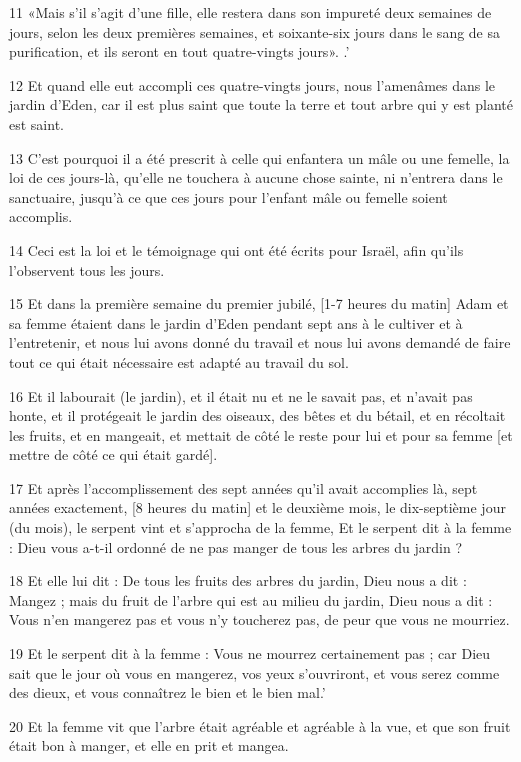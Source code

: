 \par 11 «Mais s'il s'agit d'une fille, elle restera dans son impureté deux semaines de jours, selon les deux premières semaines, et soixante-six jours dans le sang de sa purification, et ils seront en tout quatre-vingts jours». .'
\par 12 Et quand elle eut accompli ces quatre-vingts jours, nous l'amenâmes dans le jardin d'Eden, car il est plus saint que toute la terre et tout arbre qui y est planté est saint.
\par 13 C'est pourquoi il a été prescrit à celle qui enfantera un mâle ou une femelle, la loi de ces jours-là, qu'elle ne touchera à aucune chose sainte, ni n'entrera dans le sanctuaire, jusqu'à ce que ces jours pour l'enfant mâle ou femelle soient accomplis.
\par 14 Ceci est la loi et le témoignage qui ont été écrits pour Israël, afin qu'ils l'observent tous les jours.
\par 15 Et dans la première semaine du premier jubilé, [1-7 heures du matin] Adam et sa femme étaient dans le jardin d'Eden pendant sept ans à le cultiver et à l'entretenir, et nous lui avons donné du travail et nous lui avons demandé de faire tout ce qui était nécessaire est adapté au travail du sol.
\par 16 Et il labourait (le jardin), et il était nu et ne le savait pas, et n'avait pas honte, et il protégeait le jardin des oiseaux, des bêtes et du bétail, et en récoltait les fruits, et en mangeait, et mettait de côté le reste pour lui et pour sa femme [et mettre de côté ce qui était gardé].
\par 17 Et après l'accomplissement des sept années qu'il avait accomplies là, sept années exactement, [8 heures du matin] et le deuxième mois, le dix-septième jour (du mois), le serpent vint et s'approcha de la femme, Et le serpent dit à la femme : Dieu vous a-t-il ordonné de ne pas manger de tous les arbres du jardin ?
\par 18 Et elle lui dit : De tous les fruits des arbres du jardin, Dieu nous a dit : Mangez ; mais du fruit de l'arbre qui est au milieu du jardin, Dieu nous a dit : Vous n'en mangerez pas et vous n'y toucherez pas, de peur que vous ne mourriez.
\par 19 Et le serpent dit à la femme : Vous ne mourrez certainement pas ; car Dieu sait que le jour où vous en mangerez, vos yeux s'ouvriront, et vous serez comme des dieux, et vous connaîtrez le bien et le bien mal.'
\par 20 Et la femme vit que l'arbre était agréable et agréable à la vue, et que son fruit était bon à manger, et elle en prit et mangea.
